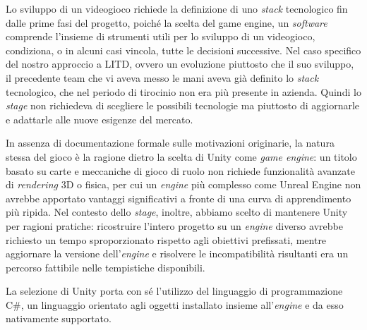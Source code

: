 
Lo sviluppo di un videogioco richiede la definizione di uno \textit{stack} tecnologico fin dalle prime fasi del progetto, poiché la scelta del \gls{game engine}, un \textit{software} comprende l'insieme di strumenti utili per lo sviluppo di un videogioco, condiziona, o in alcuni casi vincola, tutte le decisioni successive. Nel caso specifico del nostro approccio a LITD, ovvero un evoluzione piuttosto che il suo sviluppo, il precedente team che vi aveva messo le mani aveva già definito lo \textit{stack} tecnologico, che nel periodo di tirocinio non era più presente in azienda. Quindi lo \textit{stage} non richiedeva di scegliere le possibili tecnologie ma piuttosto di aggiornarle e adattarle alle nuove esigenze del mercato.

In assenza di documentazione formale sulle motivazioni originarie, la natura stessa del gioco è la ragione dietro la scelta di Unity come \textit{game engine}: un titolo basato su carte e meccaniche di gioco di ruolo non richiede funzionalità avanzate di \textit{rendering} 3D o fisica, per cui un \textit{engine} più complesso come Unreal Engine non avrebbe apportato vantaggi significativi a fronte di una curva di apprendimento più ripida.
Nel contesto dello \textit{stage}, inoltre, abbiamo scelto di mantenere Unity per ragioni pratiche: ricostruire l'intero progetto su un \textit{engine} diverso avrebbe richiesto un tempo sproporzionato rispetto agli obiettivi prefissati, mentre aggiornare la versione dell'\textit{engine} e risolvere le incompatibilità risultanti era un percorso fattibile nelle tempistiche disponibili.

La selezione di Unity porta con sé l'utilizzo del linguaggio di programmazione C\#, un linguaggio orientato agli oggetti installato insieme all'\textit{engine} e da esso nativamente supportato.


